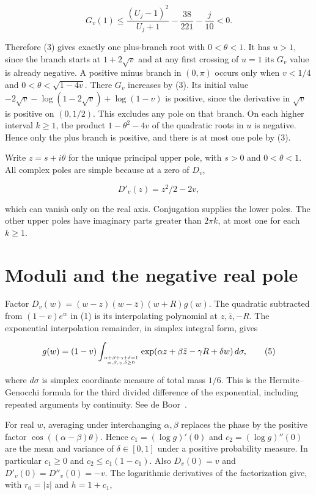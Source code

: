 \documentclass[11pt]{article}
\begin{document}
\[
G_v(1)\le\frac{(U_j-1)^2}{U_j+1}-\frac{38}{221}-\frac j{10}<0.
\]

Therefore (3) gives exactly one plus-branch root with $0<\theta<1$. It has $u>1$, since the branch starts at $1+2\sqrt v$ and at any first crossing of $u=1$ its $G_v$ value is already negative. A positive minus branch in $(0,\pi)$ occurs only when $v<1/4$ and $0<\theta<\sqrt{1-4v}$. There $G_v$ increases by (3). Its initial value $-2\sqrt v-\log(1-2\sqrt v)+\log(1-v)$ is positive, since the derivative in $\sqrt v$ is positive on $(0,1/2)$. This excludes any pole on that branch. On each higher interval $k\ge1$, the product $1-\theta^2-4v$ of the quadratic roots in $u$ is negative. Hence only the plus branch is positive, and there is at most one pole by (3).

Write $z=s+i\theta$ for the unique principal upper pole, with $s>0$ and $0<\theta<1$. All complex poles are simple because at a zero of $D_v$,

\[
D'_v(z)=z^2/2-2v,
\tag{4}
\]

which can vanish only on the real axis. Conjugation supplies the lower poles. The other upper poles have imaginary parts greater than $2\pi k$, at most one for each $k\ge1$.

\section{Moduli and the negative real pole}

Factor $D_v(w)=(w-z)(w-\bar z)(w+R)g(w)$. The quadratic subtracted from $(1-v)e^w$ in (1) is its interpolating polynomial at $z,\bar z,-R$. The exponential interpolation remainder, in simplex integral form, gives

\[
g(w)=(1-v)\int_{\alpha+\beta+\gamma+\delta=1\atop \alpha,\beta,\gamma,\delta\ge0}
\exp(\alpha z+\beta\bar z-\gamma R+\delta w)\,d\sigma ,
\tag{5}
\]

where $d\sigma$ is simplex coordinate measure of total mass $1/6$. This is the Hermite--Genocchi formula for the third divided difference of the exponential, including repeated arguments by continuity. See de Boor~\cite[eqs. (50), (52)]{deboor}.

For real $w$, averaging under interchanging $\alpha,\beta$ replaces the phase by the positive factor $\cos((\alpha-\beta)\theta)$. Hence $c_1=(\log g)'(0)$ and $c_2=(\log g)''(0)$ are the mean and variance of $\delta\in[0,1]$ under a positive probability measure. In particular $c_1\ge0$ and $c_2\le c_1(1-c_1)$. Also $D_v(0)=v$ and $D'_v(0)=D''_v(0)=-v$. The logarithmic derivatives of the factorization give, with $r_0=|z|$ and $h=1+c_1$,
\end{document}
